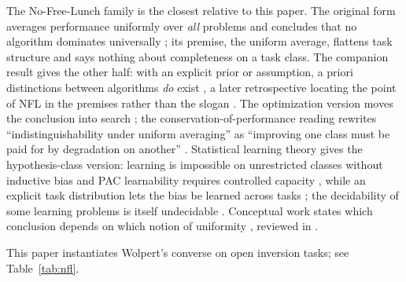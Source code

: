 The No-Free-Lunch family is the closest relative to this paper. The original form averages performance uniformly over \emph{all} problems and concludes that no algorithm dominates universally \citep{wolpert1996}; its premise, the uniform average, flattens task structure and says nothing about completeness on a task class. The companion result gives the other half: with an explicit prior or assumption, a priori distinctions between algorithms \emph{do} exist \citep{wolpert1996b}, a later retrospective locating the point of NFL in the premises rather than the slogan \citep{wolpert2021}. The optimization version moves the conclusion into search \citep{wolpert1997}; the conservation-of-performance reading rewrites ``indistinguishability under uniform averaging'' as ``improving one class must be paid for by degradation on another'' \citep{ho2002}. Statistical learning theory gives the hypothesis-class version: learning is impossible on unrestricted classes without inductive bias and PAC learnability requires controlled capacity \citep{shalev2014}, while an explicit task distribution lets the bias be learned across tasks \citep{baxter2000}; the decidability of some learning problems is itself undecidable \citep{bentdavid2019}. Conceptual work states which conclusion depends on which notion of uniformity \citep{sterkenburg2021}, reviewed in \citet{adam2019}.

This paper instantiates Wolpert's converse on open inversion tasks; see Table~\ref{tab:nfl}.

